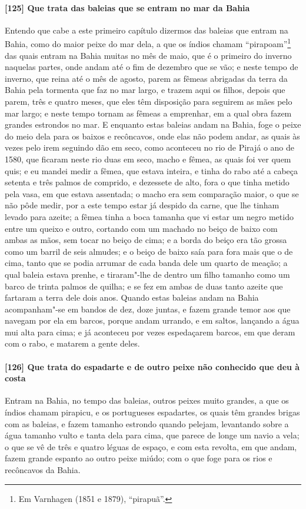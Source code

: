 \paragraph{[125] Que trata das baleias que se entram no mar da Bahia}\quad
Entendo que cabe a este primeiro capítulo dizermos das baleias que entram na Bahia, como
do maior peixe do mar dela, a que os índios chamam ``pirapoam''\footnote{ Em Varnhagen
(1851 e 1879), ``pirapuã''.} das quais entram na Bahia muitas no mês de maio, que é o
primeiro do inverno naquelas partes, onde andam até o fim de dezembro que se vão; e neste
tempo de inverno, que reina até o mês de agosto, parem as fêmeas abrigadas da terra da
Bahia pela tormenta que faz no mar largo, e trazem aqui os filhos, depois que parem, três
e quatro meses, que eles têm disposição para seguirem as mães pelo mar largo; e neste
tempo tornam as fêmeas a emprenhar, em a qual obra fazem grandes estrondos no mar. E
enquanto estas baleias andam na Bahia, foge o peixe do meio dela para os baixos e
recôncavos, onde elas não podem andar, as quais às vezes pelo irem seguindo dão em seco,
como aconteceu no rio de Pirajá o ano de 1580, que ficaram neste rio duas em seco, macho e
fêmea, as quais foi ver quem quis; e eu mandei medir a fêmea, que estava inteira, e tinha
do rabo até a cabeça setenta e três palmos de comprido, e dezessete de alto, fora o que
tinha metido pela vasa, em que estava assentada; o macho era sem comparação maior, o que
se não pôde medir, por a este tempo estar já despido da carne, que lhe tinham levado para
azeite; a fêmea tinha a boca tamanha que vi estar um negro metido entre um queixo e outro,
cortando com um machado no beiço de baixo com ambas as mãos, sem tocar no beiço de cima; e
a borda do beiço era tão grossa como um barril de seis almudes; e o beiço de baixo saía
para fora mais que o de cima, tanto que se podia arrumar de cada banda dele um quarto de
meação; a qual baleia estava prenhe, e tiraram"-lhe de dentro um filho tamanho como um
barco de trinta palmos de quilha; e se fez em ambas de duas tanto azeite que fartaram a
terra dele dois anos. Quando estas baleias andam na Bahia acompanham"-se em bandos de dez,
doze juntas, e fazem grande temor aos que navegam por ela em barcos, porque andam urrando,
e em saltos, lançando a água mui alta para cima; e já aconteceu por vezes espedaçarem
barcos, em que deram com o rabo, e matarem a gente deles.

\paragraph{[126] Que trata do espadarte e de outro peixe não conhecido que deu à costa}\quad
Entram na Bahia, no tempo das baleias, outros peixes muito grandes, a que os índios chamam
pirapicu, e os portugueses espadartes, os quais têm grandes brigas com as baleias, e fazem
tamanho estrondo quando pelejam, levantando sobre a água tamanho vulto e tanta dela para
cima, que parece de longe um navio a vela; o que se vê de três e quatro léguas de espaço,
e com esta revolta, em que andam, fazem grande espanto ao outro peixe miúdo; com o que
foge para os rios e recôncavos da Bahia.

